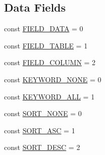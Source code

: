 \subsection*{Data Fields}
\begin{DoxyCompactItemize}
\item 
const \hyperlink{class_postgre_s_q_l_database_ac3188f4350978425c488580c5cea8468}{F\+I\+E\+L\+D\+\_\+\+D\+A\+T\+A} = 0
\item 
const \hyperlink{class_postgre_s_q_l_database_acbdf154a35cfc228dd1016e8aa4bd503}{F\+I\+E\+L\+D\+\_\+\+T\+A\+B\+L\+E} = 1
\item 
const \hyperlink{class_postgre_s_q_l_database_a87aad3e89cc6a17f293cf5410b225bbe}{F\+I\+E\+L\+D\+\_\+\+C\+O\+L\+U\+M\+N} = 2
\item 
const \hyperlink{class_postgre_s_q_l_database_a9b1a24ef01d468c146a71b333edb0c17}{K\+E\+Y\+W\+O\+R\+D\+\_\+\+N\+O\+N\+E} = 0
\item 
const \hyperlink{class_postgre_s_q_l_database_ababb5c4af464938f3f0b8f9c4fa183ba}{K\+E\+Y\+W\+O\+R\+D\+\_\+\+A\+L\+L} = 1
\item 
const \hyperlink{class_postgre_s_q_l_database_af3826c676cb54905f393f9d1f7ad48ea}{S\+O\+R\+T\+\_\+\+N\+O\+N\+E} = 0
\item 
const \hyperlink{class_postgre_s_q_l_database_a9517f2622dfc5fbb0cc64feef247eb06}{S\+O\+R\+T\+\_\+\+A\+S\+C} = 1
\item 
const \hyperlink{class_postgre_s_q_l_database_a0e633ab431ae1e5cc483a37cfe73bb09}{S\+O\+R\+T\+\_\+\+D\+E\+S\+C} = 2
\end{DoxyCompactItemize}
